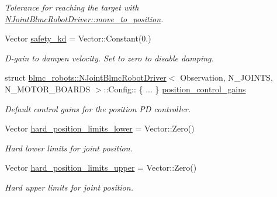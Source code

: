 \begin{DoxyCompactItemize}
\begin{DoxyCompactList}\small\item\em Tolerance for reaching the target with \hyperlink{classblmc__robots_1_1NJointBlmcRobotDriver_ab29cab22a765bce463f367b6e6dc82ff}{N\+Joint\+Blmc\+Robot\+Driver\+::move\+\_\+to\+\_\+position}. \end{DoxyCompactList}\item 
\mbox{\label{structblmc__robots_1_1NJointBlmcRobotDriver_1_1Config_a4e0c7fdf26616be5d67a9be7ee2452c7}} 
Vector \hyperlink{structblmc__robots_1_1NJointBlmcRobotDriver_1_1Config_a4e0c7fdf26616be5d67a9be7ee2452c7}{safety\+\_\+kd} = Vector\+::\+Constant(0.)
\begin{DoxyCompactList}\small\item\em D-\/gain to dampen velocity. Set to zero to disable damping. \end{DoxyCompactList}\item 
\mbox{\label{structblmc__robots_1_1NJointBlmcRobotDriver_1_1Config_a2a5c11787d14c7a809915386ee95865e}} 
struct \hyperlink{classblmc__robots_1_1NJointBlmcRobotDriver}{blmc\+\_\+robots\+::\+N\+Joint\+Blmc\+Robot\+Driver}$<$ Observation, N\+\_\+\+J\+O\+I\+N\+TS, N\+\_\+\+M\+O\+T\+O\+R\+\_\+\+B\+O\+A\+R\+DS $>$\+::Config\+:: \{ ... \}  \hyperlink{structblmc__robots_1_1NJointBlmcRobotDriver_1_1Config_a2a5c11787d14c7a809915386ee95865e}{position\+\_\+control\+\_\+gains}
\begin{DoxyCompactList}\small\item\em Default control gains for the position PD controller. \end{DoxyCompactList}\item 
Vector \hyperlink{structblmc__robots_1_1NJointBlmcRobotDriver_1_1Config_a8acf96c93bad0de685708962474fa662}{hard\+\_\+position\+\_\+limits\+\_\+lower} = Vector\+::\+Zero()
\begin{DoxyCompactList}\small\item\em Hard lower limits for joint position. \end{DoxyCompactList}\item 
Vector \hyperlink{structblmc__robots_1_1NJointBlmcRobotDriver_1_1Config_a7fbf059f76b04dc531a0d10e92fc066d}{hard\+\_\+position\+\_\+limits\+\_\+upper} = Vector\+::\+Zero()
\begin{DoxyCompactList}\small\item\em Hard upper limits for joint position. \end{DoxyCompactList}\item 

\end{DoxyCompactItemize}
